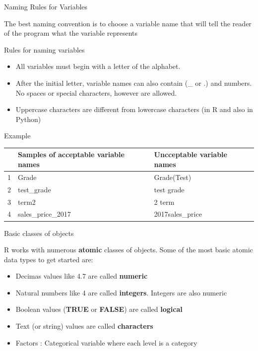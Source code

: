 \documentclass[
  ignorenonframetext,
]{beamer}
\providecommand{\tightlist}{%
  \setlength{\itemsep}{0pt}\setlength{\parskip}{0pt}}
\begin{document}
\begin{frame}{Naming Rules for Variables}
\protect\hypertarget{naming-rules-for-variables}{}

The best naming convention is to choose a variable name that will tell
the reader of the program what the variable represents

\begin{block}{Rules for naming variables}

\begin{itemize}
\tightlist
\item
  All variables must begin with a letter of the alphabet.
\item
  After the initial letter, variable names can also contain (\_ or .)
  and numbers. No spaces or special characters, however are allowed.
\item
  Uppercase characters are different from lowercase characters (in R and
  also in Python)
\end{itemize}

\end{block}

\begin{block}{Example}

\begin{table}[ht]
\centering
\begin{tabular}{rll}
  \hline
& Samples of acceptable variable names & Uncceptable variable names \\ 
  \hline
1 & Grade & Grade(Test) \\ 
  2 & test\_grade & test grade \\ 
  3 & term2 & 2 term \\ 
  4 & sales\_price\_2017 & 2017sales\_price \\ 
   \hline
\end{tabular}
\end{table}

\end{block}

\end{frame}

\begin{frame}{Basic classes of objects}
\protect\hypertarget{basic-classes-of-objects}{}

R works with numerous \textbf{atomic} classes of objects. Some of the
most basic atomic data types to get started are:

\begin{itemize}
\tightlist
\item
  Decimas values like 4.7 are called \textbf{numeric}
\item
  Natural numbers like 4 are called \textbf{integers}. Integers are also
  numeric
\item
  Boolean values (\textbf{TRUE} or \textbf{FALSE}) are called
  \textbf{logical}
\item
  Text (or string) values are called \textbf{characters}
\item
  Factors : Categorical variable where each level is a category
\end{itemize}

\end{frame}
\end{document}
